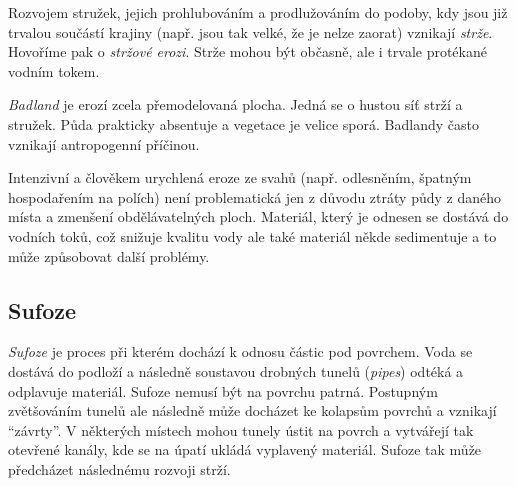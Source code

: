 Rozvojem stružek, jejich prohlubováním a prodlužováním do podoby, kdy jsou již trvalou součástí krajiny (např. jsou tak velké, že je nelze zaorat) vznikají \emph{strže}. Hovoříme pak o \emph{stržové erozi}. Strže mohou být občasně, ale i trvale protékané vodním tokem. 

\emph{Badland} je erozí zcela přemodelovaná plocha. Jedná se o hustou síť strží a stružek. Půda prakticky absentuje a vegetace je velice sporá. Badlandy často vznikají antropogenní příčinou. 

Intenzivní a člověkem urychlená eroze ze svahů (např. odlesněním, špatným hospodařením na polích) není problematická jen z důvodu ztráty půdy z daného místa a zmenšení obdělávatelných ploch. Materiál, který je odnesen se dostává do vodních toků, což snižuje kvalitu vody ale také materiál někde sedimentuje a to může způsobovat další problémy. 

\subsection{Sufoze}
\emph{Sufoze} je proces při kterém dochází k odnosu částic pod povrchem. Voda se dostává do podloží a následně soustavou drobných tunelů (\textit{pipes}) odtéká a odplavuje materiál. Sufoze nemusí být na povrchu patrná. Postupným zvětšováním tunelů ale následně může docházet ke kolapsům povrchů a vznikají \enquote{závrty}. V některých místech mohou tunely ústit na povrch a vytvářejí tak otevřené kanály, kde se na úpatí ukládá vyplavený materiál. Sufoze tak může předcházet následnému rozvoji strží. 

%
%	
